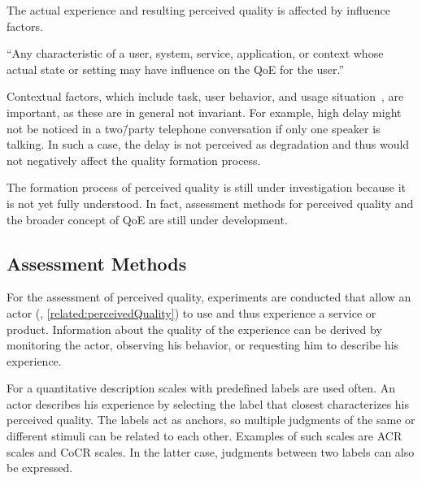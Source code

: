The actual experience and resulting perceived quality is affected by influence factors.
\begin{definition}
``Any characteristic of a user, system, service, application, or context whose actual state or setting may have influence on the \acl{QoE} for the user.''~\citep[][p.\,56]{reiter_factors_2014}
\end{definition}
Contextual factors, which include task, user behavior, and usage situation~\citep[][p.\,56]{reiter_factors_2014}, are important, as these are in general not invariant.
For example, high delay might not be noticed in a two\=/party telephone conversation if only one speaker is talking.
In such a case, the delay is not perceived as degradation and thus would not negatively affect the quality formation process.

The formation process of perceived quality is still under investigation because it is not yet fully understood. %
In fact, assessment methods for perceived quality and the broader concept of \ac{QoE} are still under development.

\subsection{Assessment Methods}
For the assessment of perceived quality, experiments are conducted that allow an actor (\cf, \autoref{related:perceivedQuality}) to use and thus experience a service or product.
Information about the quality of the experience can be derived by monitoring the actor, observing his behavior, or requesting him to describe his experience.

For a quantitative description scales with predefined labels are used often.
An actor describes his experience by selecting the label that closest characterizes his perceived quality.
The labels act as anchors, so multiple judgments of the same or different stimuli can be related to each other.
Examples of such scales are \acf{ACR} scales and \acf{CoCR} scales.
In the latter case, judgments between two labels can also be expressed.


